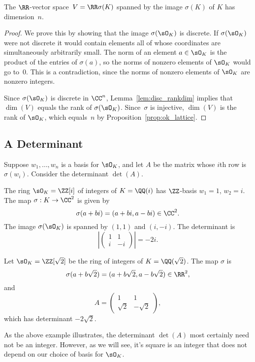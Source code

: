 \begin{proposition}
  The $\RR$-vector space~$V=\RR\sigma(K)$ spanned by the image
  $\sigma(K)$ of $K$ has dimension~$n$.
\end{proposition}
\begin{proof}
  We prove this by showing that the image $\sigma(\sO_K)$ is discrete. If
  $\sigma(\sO_K)$ were not discrete it would contain elements all of
  whose coordinates are simultaneously arbitrarily small.  The norm of
  an element $a\in \sO_K$ is the product of the entries of $\sigma(a)$,
  so the norms of nonzero elements of $\sO_K$ would go to~$0$.  This is a
  contradiction, since the norms of nonzero elements of $\sO_K$ are
  nonzero integers.
  
  Since $\sigma(\sO_K)$ is discrete in $\CC^n$, Lemma~\ref{lem:disc_rankdim}
  implies that $\dim(V)$ equals the rank of $\sigma(\sO_K)$.  Since~$\sigma$
  is injective, $\dim(V)$ is the rank of $\sO_K$, which equals~$n$ by
  Proposition~\ref{prop:ok_lattice}.
\end{proof}

\subsection{A Determinant}
Suppose $w_1,\ldots, w_n$ is a basis for
$\sO_K$, and let $A$ be the matrix whose $i$th row is $\sigma(w_i)$.
Consider the determinant $\det(A)$.
\begin{example}
  The ring $\sO_K=\ZZ[i]$ of integers of $K=\QQ(i)$
  has $\ZZ$-basis $w_1=1$, $w_2=i$.
  The map $\sigma:K\to \CC^2$ is given by
  $$
  \sigma(a+bi) = (a+bi,a-bi)\in\CC^2.
  $$
  The image $\sigma(\sO_K)$ is spanned by
  $(1,1)$ and $(i,-i)$.
  The determinant is
  \[
    \left|\begin{pmatrix}
      1 & 1 \\
      i & -i
    \end{pmatrix}\right| = -2i.
  \]
  
  Let $\sO_K=\ZZ[\sqrt{2}]$ be the ring of integers of $K=\QQ(\sqrt{2})$.
  The map $\sigma$ is
  \[
  \sigma(a+b\sqrt{2}) = (a+b\sqrt{2},a-b\sqrt{2})\in\RR^2,
  \]
  and
  \[
  A = \begin{pmatrix} 1 & 1 \\ \sqrt{2} & -\sqrt{2} \end{pmatrix},
  \]
  which has determinant
  $ -2\sqrt{2}$.
\end{example}
As the above example illustrates, the determinant $\det(A)$ most
certainly need not be an integer.  However, as we will see, it's
square is an integer that does not depend on our choice of
basis for $\sO_K$.

